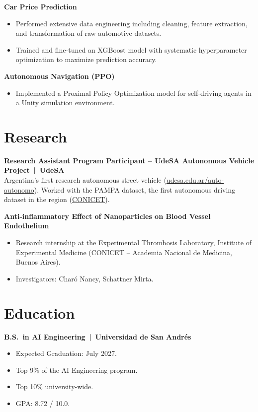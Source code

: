 \documentclass[a4paper,11pt]{article}
\begin{document}
\textbf{Car Price Prediction}
\begin{itemize}
    \item Performed extensive data engineering including cleaning, feature extraction, and transformation of raw automotive datasets.
    \item Trained and fine-tuned an XGBoost model with systematic hyperparameter optimization to maximize prediction accuracy.
\end{itemize}

\textbf{Autonomous Navigation (PPO)}
\begin{itemize}
    \item Implemented a Proximal Policy Optimization model for self-driving agents in a Unity simulation environment.
\end{itemize}

\section*{Research}

\textbf{Research Assistant Program Participant -- UdeSA Autonomous Vehicle Project \,|\, UdeSA}\\
Argentina's first research autonomous street vehicle (\href{https://udesa.edu.ar/auto-autonomo}{udesa.edu.ar/auto-autonomo}). Worked with the PAMPA dataset, the first autonomous driving dataset in the region (\href{https://ri.conicet.gov.ar/handle/11336/242774}{CONICET}).
\smallskip

\textbf{Anti-inflammatory Effect of Nanoparticles on Blood Vessel Endothelium}
\begin{itemize}
    \item Research internship at the Experimental Thrombosis Laboratory, Institute of Experimental Medicine (CONICET -- Academia Nacional de Medicina, Buenos Aires).
    \item Investigators: Charó Nancy, Schattner Mirta.
\end{itemize}

\section*{Education}

\textbf{B.S.\ in AI Engineering \,|\, Universidad de San Andrés}
\begin{itemize}
    \item Expected Graduation: July 2027.
    \item Top 9\% of the AI Engineering program.
    \item Top 10\% university-wide.
    \item GPA: 8.72 / 10.0.
\end{itemize}
\end{document}
